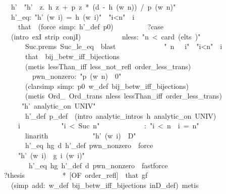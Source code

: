\documentclass[runningheads]{llncs}
\begin{document}
\begin{isabelle}
\ \ \ \ \ \ \ \ \ h'\ \ "h'\ \isasymequiv \ \isasymlambda z.\ h\ z\ +\ p\ z\ *\ (d\ -\ h\ (w\ n))\ /\ p\ (w\ n)"\isanewline
\ \ \ \ \ \ \ \ \ h'\_eq:\ "h'\ (w\ i)\ =\ h\ (w\ i)"\ \ "i<n"\ \ i\isanewline
\ \ \ \ \ \ \ \ \ \ \ that\ \ (force\ simp:\ h'\_def\ p0)\isanewline
\ \ \ \ \ \ \ \ \ ?case\isanewline
\ \ \ \ \ \ \ \ \ (intro\ exI\ strip\ conjI)\isanewline
\ \ \ \ \ \ \ \ \ \ \ nless:\ "n\ <\ card\ (elts\ \isasymgamma )"\isanewline
\ \ \ \ \ \ \ \ \ \ \ \ \ Suc.prems\ Suc\_le\_eq\ \ blast\isanewline
\ \ \ \ \ \ \ \ \ \ \ \isasymeta \ \ "\isasymeta \ n\ \isasymnoteq \ \isasymeta \ i"\ \ "i<n"\ \ i\isanewline
\ \ \ \ \ \ \ \ \ \ \ \ \ that\ \ bij\_betw\_iff\_bijections\isanewline
\ \ \ \ \ \ \ \ \ \ \ \ \ (metis\ lessThan\_iff\ less\_not\_refl\ order\_less\_trans)\isanewline
\ \ \ \ \ \ \ \ \ \ \ \isasymzeta \ \isasymeta \ \isasymgamma \ \ pwn\_nonzero:\ "p\ (w\ n)\ \isasymnoteq \ 0"\isanewline
\ \ \ \ \ \ \ \ \ \ \ \ \ (clarsimp\ simp:\ p0\ w\_def\ bij\_betw\_iff\_bijections)\isanewline
\ \ \ \ \ \ \ \ \ \ \ \ \ (metis\ Ord\_\ Ord\_trans\ nless\ lessThan\_iff\ order\_less\_trans)\isanewline
\ \ \ \ \ \ \ \ \ \ \ \ "h'\ analytic\_on\ UNIV"\isanewline
\ \ \ \ \ \ \ \ \ \ \ \ \ h'\_def\ p\_def\ \ (intro\ analytic\_intros\ \isacartoucheopen h\ analytic\_on\ UNIV\isacartoucheclose )\isanewline
\ \ \ \ \ \ \ \ \ \ \ i\isanewline
\ \ \ \ \ \ \ \ \ \ \ "i\ <\ Suc\ n"\isanewline
\ \ \ \ \ \ \ \ \ \ \ \ \isasymsection :\ "i\ <\ n\ \isasymor \ i\ =\ n"\isanewline
\ \ \ \ \ \ \ \ \ \ \ \ \ linarith\isanewline
\ \ \ \ \ \ \ \ \ \ \ \ "h'\ (w\ i)\ \isasymin \ D"\isanewline
\ \ \ \ \ \ \ \ \ \ \ \ \ h'\_eq\ hg\ d\ h'\_def\ pwn\_nonzero\ \ force\isanewline
\ \ \ \ \ \ \ \ \ \ \ "h'\ (w\ i)\ \isasymnoteq \ g\ i\ (w\ i)"\isanewline
\ \ \ \ \ \ \ \ \ \ \ \ \ \isasymsection \ h'\_eq\ hg\ h'\_def\ d\ pwn\_nonzero\ \ fastforce\isanewline
\ \ \ \ \ \ \ \ \isanewline
\ \ \ \ \ \ \isanewline
\ \ \ \ \ \ \ ?thesis\ \isanewline
\ \ \ \ \ \ \ \ \ *\ [OF\ order\_refl]\ \isasymeta \ that\ gf\ \isanewline
\ \ \ \ \ \ \ \ \ (simp\ add:\ w\_def\ bij\_betw\_iff\_bijections\ inD\_def)\ metis
\end{isabelle}
\end{document}
